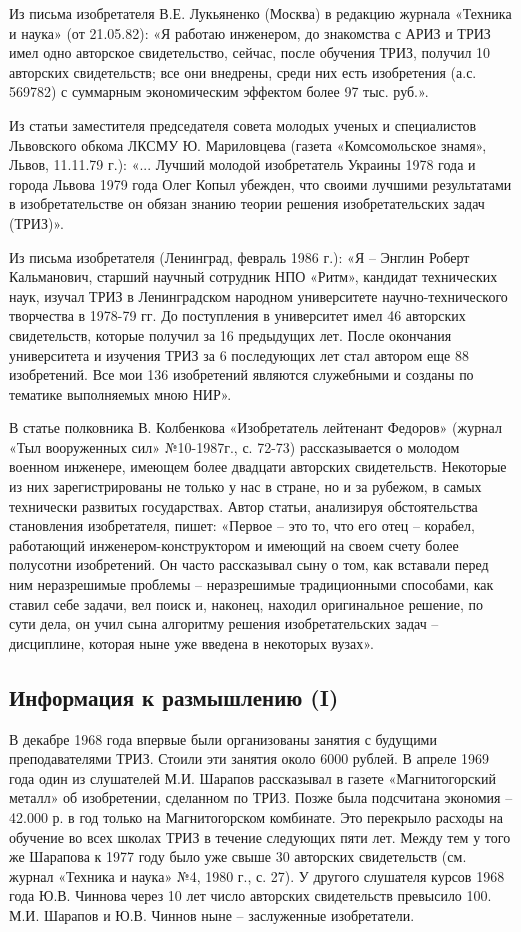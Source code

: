 \documentclass[11pt,a4paper]{article}
\begin{document}
Из письма изобретателя В.Е. Лукьяненко (Москва) в редакцию журнала «Техника и
наука» (от 21.05.82): «Я работаю инженером, до знакомства с АРИЗ и ТРИЗ имел
одно авторское свидетельство, сейчас, после обучения ТРИЗ, получил 10
авторских свидетельств; все они внедрены, среди них есть изобретения
(а.с. 569782) с суммарным экономическим эффектом более 97 тыс. руб.».

Из статьи заместителя председателя совета молодых ученых и специалистов
Львовского обкома ЛКСМУ Ю. Мариловцева (газета «Комсомольское знамя», Львов,
11.11.79 г.): «... Лучший молодой изобретатель Украины 1978 года и города
Львова 1979 года Олег Копыл убежден, что своими лучшими результатами в
изобретательстве он обязан знанию теории решения изобретательских задач
(ТРИЗ)».

Из письма изобретателя (Ленинград, февраль 1986 г.): «Я -- Энглин Роберт
Кальманович, старший научный сотрудник НПО «Ритм», кандидат технических наук,
изучал ТРИЗ в Ленинградском народном университете научно-технического
творчества в 1978-79 гг. До поступления в университет имел 46 авторских
свидетельств, которые получил за 16 предыдущих лет. После окончания
университета и изучения ТРИЗ за 6 последующих лет стал автором еще 88
изобретений. Все мои 136 изобретений являются служебными и созданы по тематике
выполняемых мною НИР».

В статье полковника В. Колбенкова «Изобретатель лейтенант Федоров» (журнал
«Тыл вооруженных сил» №10-1987г., с. 72-73) рассказывается о молодом военном
инженере, имеющем более двадцати авторских свидетельств. Некоторые из них
зарегистрированы не только у нас в стране, но и за рубежом, в самых технически
развитых государствах. Автор статьи, анализируя обстоятельства становления
изобретателя, пишет: «Первое -- это то, что его отец -- корабел, работающий
инженером-конструктором и имеющий на своем счету более полусотни изобретений.
Он часто рассказывал сыну о том, как вставали перед ним неразрешимые проблемы
-- неразрешимые традиционными способами, как ставил себе задачи, вел поиск и,
наконец, находил оригинальное решение, по сути дела, он учил сына алгоритму
решения изобретательских задач -- дисциплине, которая ныне уже введена в
некоторых вузах».

\subsection{Информация к размышлению (I)}

В декабре 1968 года впервые были организованы занятия с будущими
преподавателями ТРИЗ. Стоили эти занятия около 6000 рублей. В апреле 1969 года
один из слушателей М.И. Шарапов рассказывал в газете «Магнитогорский металл»
об изобретении, сделанном по ТРИЗ. Позже была подсчитана экономия -- 42.000
р. в год только на Магнитогорском комбинате. Это перекрыло расходы на обучение
во всех школах ТРИЗ в течение следующих пяти лет. Между тем у того же Шарапова
к 1977 году было уже свыше 30 авторских свидетельств (см. журнал «Техника и
наука» №4, 1980 г., с. 27). У другого слушателя курсов 1968 года Ю.В. Чиннова
через 10 лет число авторских свидетельств превысило 100. М.И. Шарапов и
Ю.В. Чиннов ныне -- заслуженные изобретатели.
\end{document}
